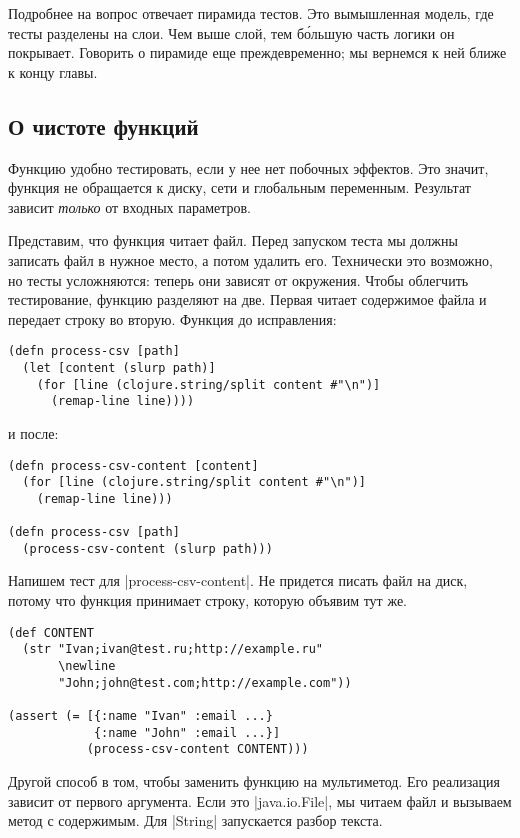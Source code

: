 Подробнее на вопрос отвечает пирамида
тестов. Это вымышленная
модель, где тесты разделены на слои. Чем выше слой, тем б\'{о}льшую часть логики
он покрывает. Говорить о пирамиде еще преждевременно; мы вернемся к ней ближе к
концу главы.

\subsection{О чистоте функций}

Функцию удобно тестировать, если у нее нет побочных эффектов. Это значит,
функция не обращается к диску, сети и глобальным переменным. Результат зависит
\emph{только} от входных параметров.

Представим, что функция читает файл. Перед запуском теста мы должны записать
файл в нужное место, а потом удалить его. Технически это возможно, но тесты
усложняются: теперь они зависят от окружения. Чтобы облегчить тестирование,
функцию разделяют на две. Первая читает содержимое файла и передает строку во
вторую. Функция до исправления:

\begin{verbatim}
(defn process-csv [path]
  (let [content (slurp path)]
    (for [line (clojure.string/split content #"\n")]
      (remap-line line))))
\end{verbatim}

\noindent
и после:

\begin{verbatim}
(defn process-csv-content [content]
  (for [line (clojure.string/split content #"\n")]
    (remap-line line)))

(defn process-csv [path]
  (process-csv-content (slurp path)))
\end{verbatim}

Напишем тест для \spverb|process-csv-content|. Не придется писать файл на диск,
потому что функция принимает строку, которую объявим тут же.

\begin{verbatim}
(def CONTENT
  (str "Ivan;ivan@test.ru;http://example.ru"
       \newline
       "John;john@test.com;http://example.com"))

(assert (= [{:name "Ivan" :email ...}
            {:name "John" :email ...}]
           (process-csv-content CONTENT)))
\end{verbatim}

Другой способ в том, чтобы заменить функцию на мультиметод. Его реализация
зависит от первого аргумента. Если это \spverb|java.io.File|, мы читаем файл и
вызываем метод с содержимым. Для \spverb|String| запускается разбор текста.

